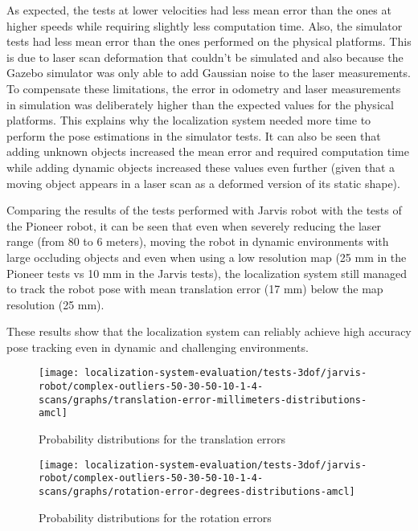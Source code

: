 As expected, the tests at lower velocities had less mean error than the ones at higher speeds while requiring slightly less computation time. Also, the simulator tests had less mean error than the ones performed on the physical platforms. This is due to laser scan deformation that couldn't be simulated and also because the Gazebo simulator was only able to add Gaussian noise to the laser measurements. To compensate these limitations, the error in odometry and laser measurements in simulation was deliberately higher than the expected values for the physical platforms. This explains why the localization system needed more time to perform the pose estimations in the simulator tests. It can also be seen that adding unknown objects increased the mean error and required computation time while adding dynamic objects increased these values even further (given that a moving object appears in a laser scan as a deformed version of its static shape).

Comparing the results of the tests performed with Jarvis robot  with the tests of the Pioneer robot, it can be seen that even when severely reducing the laser range (from 80 to 6 meters), moving the robot in dynamic environments with large occluding objects and even when using a low resolution map (25 mm in the Pioneer tests vs 10 mm in the Jarvis tests), the localization system still managed to track the robot pose with mean translation error (17 mm) below the map resolution (25 mm).

These results show that the localization system can reliably achieve high accuracy pose tracking even in dynamic and challenging environments.

\begin{figure}[H]
	\centering
	\begin{minipage}[H]{0.47\textwidth}
		\centering
		\texttt{[image: localization-system-evaluation/tests-3dof/jarvis-robot/complex-outliers-50-30-50-10-1-4-scans/graphs/translation-error-millimeters-distributions-amcl]}
		\caption{Probability distributions for the  translation errors}
		\label{fig:localization-system-evaluation_complex-path-with-outliers-50-30-50-10cm-per-sec-velocity-1-4-translation-error-amcl}
	\end{minipage}\hfill
	\begin{minipage}[H]{0.47\textwidth}
		\centering
		\texttt{[image: localization-system-evaluation/tests-3dof/jarvis-robot/complex-outliers-50-30-50-10-1-4-scans/graphs/rotation-error-degrees-distributions-amcl]}
		\caption{Probability distributions for the  rotation errors}
		\label{fig:localization-system-evaluation_complex-path-with-outliers-50-30-50-10cm-per-sec-velocity-1-4-rotation-error-amcl}
	\end{minipage}
\end{figure}

